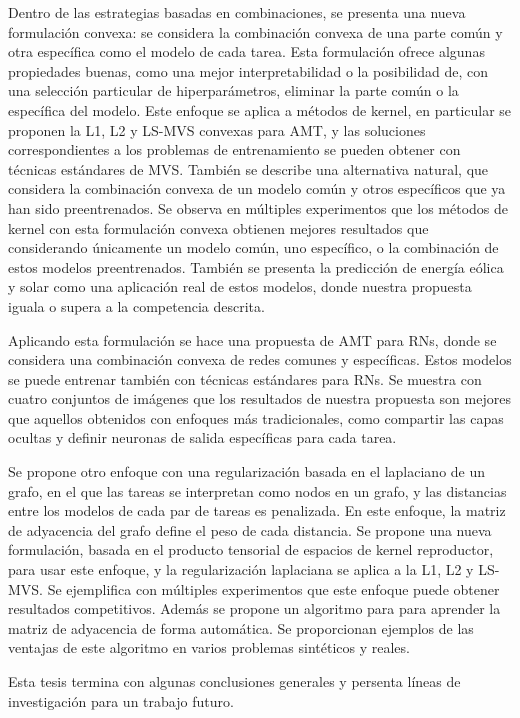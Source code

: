 \documentclass[a4paper, 11pt]{Thesis}  %
\begin{document}
{{Dentro de las estrategias basadas en combinaciones, se presenta una nueva formulación convexa: se considera la combinación convexa de una parte común y otra específica como el modelo de cada tarea. Esta formulación ofrece algunas propiedades buenas, como una mejor interpretabilidad o la posibilidad de, con una selección particular de hiperparámetros, eliminar la parte común o la específica del modelo. Este enfoque se aplica a métodos de kernel, en particular se proponen la L1, L2 y LS-MVS convexas para AMT, y las soluciones correspondientes a los problemas de entrenamiento se pueden obtener con técnicas estándares de MVS. También se describe una alternativa natural, que considera la combinación convexa de un modelo común y otros específicos que ya han sido preentrenados. 
Se observa en múltiples experimentos que los métodos de kernel con esta formulación convexa obtienen mejores resultados que considerando únicamente un modelo común, uno específico, o la combinación de estos modelos preentrenados. También se presenta la predicción de energía eólica y solar como una aplicación real de estos modelos, donde nuestra propuesta iguala o supera a la competencia descrita.

Aplicando esta formulación se hace una propuesta de AMT para RNs, donde se considera una combinación convexa de redes comunes y específicas. Estos modelos se puede entrenar también con técnicas estándares para RNs. Se muestra con cuatro conjuntos de imágenes que los resultados de nuestra propuesta son mejores que aquellos obtenidos con enfoques más tradicionales, como compartir las capas ocultas y definir neuronas de salida específicas para cada tarea.

Se propone otro enfoque con una regularización basada en el laplaciano de un grafo, en el que las tareas se interpretan como nodos en un grafo, y las distancias entre los modelos de cada par de tareas es penalizada. En este enfoque, la matriz de adyacencia del grafo define el peso de cada distancia. Se propone una nueva formulación, basada en el producto tensorial de espacios de kernel reproductor, para usar este enfoque, y la regularización laplaciana se aplica a la L1, L2 y LS-MVS. Se ejemplifica con múltiples experimentos que este enfoque puede obtener resultados competitivos. Además se propone un algoritmo para para aprender la matriz de adyacencia de forma automática. Se proporcionan ejemplos de las ventajas de este algoritmo en varios problemas sintéticos y reales.

Esta tesis termina con algunas conclusiones generales y persenta líneas de investigación para un trabajo futuro.
}
}
\clearpage  %
\end{document}
